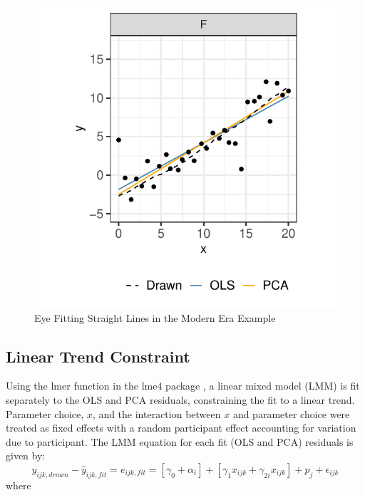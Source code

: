 \documentclass[12pt]{article}
\begin{document}
\begin{figure}[tbp]

{\centering \includegraphics[width=0.65\linewidth,]{Eye-Fitting-Straight-Lines-in-the-Modern-Era_files/figure-latex/eyefitting-example-plot-1} 

}

\caption{Eye Fitting Straight Lines in the Modern Era Example}\label{fig:eyefitting-example-plot}
\end{figure}

\hypertarget{linear-trend-constraint}{%
\subsection{Linear Trend Constraint}\label{linear-trend-constraint}}

Using the lmer function in the lme4 package \citep{lme4}, a linear mixed
model (LMM) is fit separately to the OLS and PCA residuals, constraining
the fit to a linear trend. Parameter choice, \(x\), and the interaction
between \(x\) and parameter choice were treated as fixed effects with a
random participant effect accounting for variation due to participant.
The LMM equation for each fit (OLS and PCA) residuals is given by:
\begin{equation}
y_{ijk,drawn} - \hat y_{ijk,fit} = e_{ijk,fit} = \left[\gamma_0 + \alpha_i\right] + \left[\gamma_{1} x_{ijk} + \gamma_{2i} x_{ijk}\right] + p_{j} + \epsilon_{ijk}
\end{equation} \noindent where
\end{document}
